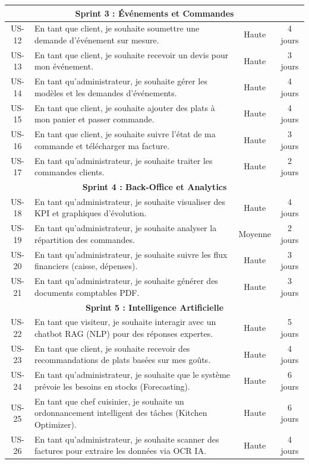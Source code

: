 \begin{longtable}{|c|p{7cm}|c|c|}
    \multicolumn{4}{|c|}{\textbf{Sprint 3 : Événements et Commandes}} \\
    \hline
    US-12 & En tant que client, je souhaite soumettre une demande d'événement sur mesure. & Haute & 4 jours \\
    \hline
    US-13 & En tant que client, je souhaite recevoir un devis pour mon événement. & Haute & 3 jours \\
    \hline
    US-14 & En tant qu'administrateur, je souhaite gérer les modèles et les demandes d'événements. & Haute & 4 jours \\
    \hline
    US-15 & En tant que client, je souhaite ajouter des plats à mon panier et passer commande. & Haute & 4 jours \\
    \hline
    US-16 & En tant que client, je souhaite suivre l'état de ma commande et télécharger ma facture. & Haute & 3 jours \\
    \hline
    US-17 & En tant qu'administrateur, je souhaite traiter les commandes clients. & Haute & 2 jours \\
    \hline

    \multicolumn{4}{|c|}{\textbf{Sprint 4 : Back-Office et Analytics}} \\
    \hline
    US-18 & En tant qu'administrateur, je souhaite visualiser des KPI et graphiques d'évolution. & Haute & 4 jours \\
    \hline
    US-19 & En tant qu'administrateur, je souhaite analyser la répartition des commandes. & Moyenne & 2 jours \\
    \hline
    US-20 & En tant qu'administrateur, je souhaite suivre les flux financiers (caisse, dépenses). & Haute & 3 jours \\
    \hline
    US-21 & En tant qu'administrateur, je souhaite générer des documents comptables PDF. & Haute & 3 jours \\
    \hline

    \multicolumn{4}{|c|}{\textbf{Sprint 5 : Intelligence Artificielle}} \\
    \hline
    US-22 & En tant que visiteur, je souhaite interagir avec un chatbot RAG (NLP) pour des réponses expertes. & Haute & 5 jours \\
    \hline
    US-23 & En tant que client, je souhaite recevoir des recommandations de plats basées sur mes goûts. & Haute & 4 jours \\
    \hline
    US-24 & En tant qu'administrateur, je souhaite que le système prévoie les besoins en stocks (Forecasting). & Haute & 6 jours \\
    \hline
    US-25 & En tant que chef cuisinier, je souhaite un ordonnancement intelligent des tâches (Kitchen Optimizer). & Haute & 6 jours \\
    \hline
    US-26 & En tant qu'administrateur, je souhaite scanner des factures pour extraire les données via OCR IA. & Haute & 4 jours \\
    \hline
\end{longtable}

